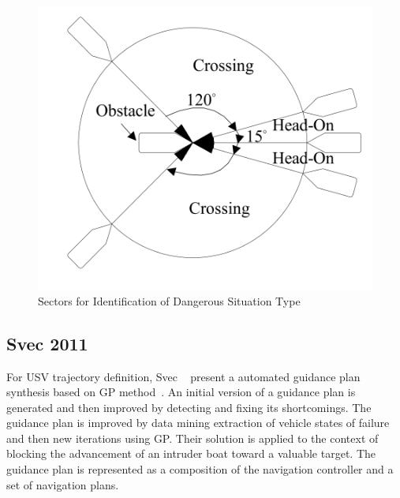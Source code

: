     \begin{figure}[H]
        \centering
        \includegraphics[scale=0.4]{figs/Chap3/Zhuang2011Motion_Sectors.png}
        \caption{Sectors for Identification of Dangerous Situation Type \cite{Zhuang2011Motion}}
        \label{fig:Zhuang2011Motion_Sectors}
    \end{figure}
    
    \subsection{Svec 2011}
    For \ac{USV} trajectory definition, Svec \etal~\cite{Svec2011aAutomated, Svec2012Automated} present a automated guidance plan synthesis based on \ac{GP} method~\cite{Russel2003AI_GA}.
    An initial version of a guidance plan is generated and then improved by detecting and fixing its shortcomings. The guidance plan is improved by data mining extraction of vehicle states of failure and then new iterations using \ac{GP}. Their solution is applied to the context of blocking the advancement of an intruder boat toward a valuable target. The guidance plan is represented as a composition of the navigation controller and a set of navigation plans.
    
